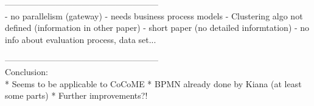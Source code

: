 ------------------------------------------------------\\
- no parallelism (gateway) 
- needs business process models
- Clustering algo not defined (information in other paper)
- short paper (no detailed informtation)
- no info about evaluation process, data set...




------------------------------------------------------\\
Conclusion: \\
* Seems to be applicable to CoCoME
* BPMN already done by Kiana (at least some parts)
* Further improvements?!











